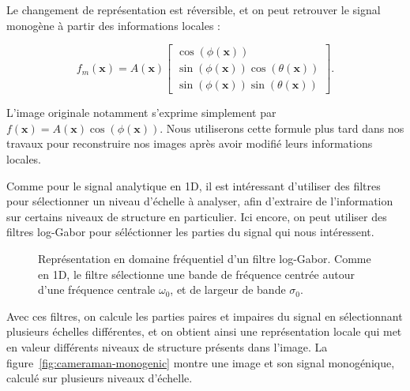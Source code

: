Le changement de représentation est réversible, et on peut retrouver le signal monogène à partir des informations locales :

\begin{equation}
    f_m(\mathbf{x}) = A(\mathbf{x})\left[
        \begin{array}{c}
        \cos(\phi(\mathbf{x})) \\
        \sin(\phi(\mathbf{x}))\cos(\theta(\mathbf{x})) \\
        \sin(\phi(\mathbf{x}))\sin(\theta(\mathbf{x}))
        \end{array}
    \right].
\end{equation}

L'image originale notamment s'exprime simplement par $f(\mathbf{x}) = A(\mathbf{x})\cos(\phi(\mathbf{x}))$. Nous utiliserons cette formule plus tard dans nos travaux pour reconstruire nos images après avoir modifié leurs informations locales.

\bigskip

Comme pour le signal analytique en 1D, il est intéressant d'utiliser des filtres pour sélectionner un niveau d'échelle à analyser, afin d'extraire de l'information sur certains niveaux de structure en particulier. Ici encore, on peut utiliser des filtres log-Gabor pour séléctionner les parties du signal qui nous intéressent.

\begin{figure}
    \centering

    \caption[Filtre log-Gabor en 2D]{Représentation en domaine fréquentiel d'un filtre log-Gabor. Comme en 1D, le filtre sélectionne une bande de fréquence centrée autour d'une fréquence centrale $\omega_0$, et de largeur de bande $\sigma_0$.}
    \label{fig:2D-log-gabor}
\end{figure}

Avec ces filtres, on calcule les parties paires et impaires du signal en sélectionnant plusieurs échelles différentes, et on obtient ainsi une représentation locale qui met en valeur différents niveaux de structure présents dans l'image. La figure~\ref{fig:cameraman-monogenic} montre une image et son signal monogénique, calculé sur plusieurs niveaux d'échelle.

